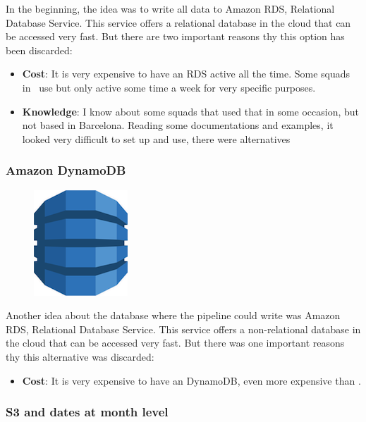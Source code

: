 In the beginning, the idea was to write all data to Amazon RDS, Relational Database Service\cite{rds}. This service offers a relational database in the cloud that can be accessed very fast. But there are two important reasons thy this option has been discarded:

\begin{itemize}
    \item \textbf{Cost}: It is very expensive to have an RDS active all the time. Some squads in \company\ use  but only active some time a week for very specific purposes.
    \item \textbf{Knowledge}: I know about some squads that used that in some occasion, but not based in Barcelona. Reading some documentations and examples, it looked very difficult to set up and use, there were alternatives 
\end{itemize}

\subsubsection*{Amazon DynamoDB} \label{dynamodb}

\begin{figure}[H]
\includegraphics[scale=0.2]{resources/dynamodb-logo.png}
\end{figure}

Another idea about the database where the pipeline could write was Amazon RDS, Relational Database Service\cite{dynamodb}. This service offers a non-relational database in the cloud that can be accessed very fast. But there was one important reasons thy this alternative was discarded:

\begin{itemize}
    \item \textbf{Cost}: It is very expensive to have an DynamoDB, even more expensive than .
\end{itemize}

\subsubsection*{S3 and dates at month level} \label{month_version}

